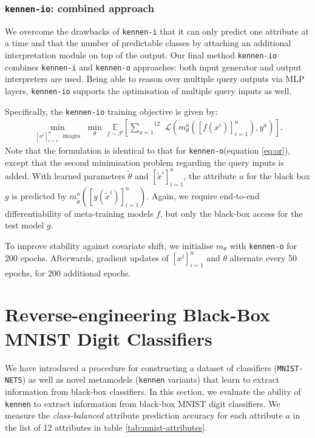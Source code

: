 \documentclass{article} %
\newcommand{\metamnist}{\texttt{MNIST-NETS}\xspace}
\newcommand{\kennen}{\texttt{kennen}\xspace}
\newcommand{\OR}{\texttt{kennen-o}\xspace}
\newcommand{\IC}{\texttt{kennen-i}\xspace}
\newcommand{\ORIC}{\texttt{kennen-io}\xspace}
\begin{document}
\subsubsection*{\ORIC: combined approach}

We overcome the drawbacks of \IC that it can only predict one attribute at a time and that the number of predictable classes by attaching an additional interpretation module on top of the output. Our final method \ORIC combines \IC and \OR approaches: both input generator and output interpreters are used. Being able to reason over multiple query outputs via MLP layers, \ORIC supports the optimisation of multiple query inputs as well. 

Specifically, the \ORIC training objective is given by:
\begin{align}
\label{eq:oric}
\underset{[x^i]_{i=1}^n:\text{ images}}{\min}\,\,\underset{\theta}{\min}\,\,\underset{f\sim \mathcal{F}}{\mathbb{E}}\left[\overset{12}{\underset{a=1}{\sum}}\,\,\mathcal{L}\left(m^a_{\theta}\left([f(x^i)]_{i=1}^n\right),y^a\right)\right].
\end{align}
Note that the formulation is identical to that for \OR (equation \ref{eq:or}), except that the second minimisation problem regarding the query inputs is added. With learned parameters $\tilde{\theta}$ and $[\tilde{x}^i]_{i=1}^n$, the attribute $a$ for the black box $g$ is predicted by $m^a_{\tilde{\theta}}\left([g(\tilde{x}^i)]_{i=1}^n\right)$. Again, we require end-to-end differentiability of meta-training models $f$, but only the black-box access for the test model $g$.

To improve stability against covariate shift, we initialise $m_\theta$ with \OR for 200 epochs. Afterwards, gradient updates of $[x^i]_{i=1}^n$ and $\theta$ alternate every 50 epochs, for 200 additional epochs.

\section{\label{sec:mnist}Reverse-engineering Black-Box MNIST Digit Classifiers}

We have introduced a procedure for constructing a dataset of classifiers (\metamnist) as well as novel metamodels (\kennen variants) that learn to extract information from black-box classifiers. In this section, we evaluate the ability of \kennen to extract information from black-box MNIST digit classifiers. We measure the \emph{class-balanced} attribute prediction accuracy for each attribute $a$ in the list of 12 attributes in table \ref{tab:mnist-attributes}.
\end{document}
